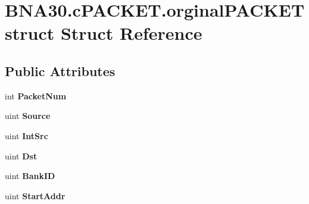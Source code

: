 \hypertarget{struct_b_n_a30_1_1c_p_a_c_k_e_t_1_1orginal_p_a_c_k_e_tstruct}{}\section{B\+N\+A30.\+c\+P\+A\+C\+K\+E\+T.\+orginal\+P\+A\+C\+K\+E\+Tstruct Struct Reference}
\label{struct_b_n_a30_1_1c_p_a_c_k_e_t_1_1orginal_p_a_c_k_e_tstruct}
\subsection*{Public Attributes}
\begin{DoxyCompactItemize}
\item 
\mbox{\label{struct_b_n_a30_1_1c_p_a_c_k_e_t_1_1orginal_p_a_c_k_e_tstruct_a8dd630ee9ad84586204f3ebb0911664a}} 
int {\bfseries Packet\+Num}
\item 
\mbox{\label{struct_b_n_a30_1_1c_p_a_c_k_e_t_1_1orginal_p_a_c_k_e_tstruct_a0a44c1947a319f2a9ebaae4077d0b2b0}} 
uint {\bfseries Source}
\item 
\mbox{\label{struct_b_n_a30_1_1c_p_a_c_k_e_t_1_1orginal_p_a_c_k_e_tstruct_a5afc64d5dd34d6c17f3e7dbb3d9f841a}} 
uint {\bfseries Int\+Src}
\item 
\mbox{\label{struct_b_n_a30_1_1c_p_a_c_k_e_t_1_1orginal_p_a_c_k_e_tstruct_a0be883822a522777b6bf4ff86423e0b3}} 
uint {\bfseries Dst}
\item 
\mbox{\label{struct_b_n_a30_1_1c_p_a_c_k_e_t_1_1orginal_p_a_c_k_e_tstruct_a11f04a3453b1889f75806d607b1d3e21}} 
uint {\bfseries Bank\+ID}
\item 
\mbox{\label{struct_b_n_a30_1_1c_p_a_c_k_e_t_1_1orginal_p_a_c_k_e_tstruct_ad54737f64877292d2a35e81880afba0e}} 
uint {\bfseries Start\+Addr}
\item 
\mbox{\label{struct_b_n_a30_1_1c_p_a_c_k_e_t_1_1orginal_p_a_c_k_e_tstruct_a0099fc6979002db8707df61c9a0d372c}} 

\end{DoxyCompactItemize}
